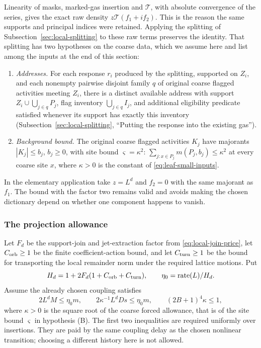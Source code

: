 Linearity of masks, marked-gas insertion and $\mathcal T$, with
absolute convergence of the series, gives the exact raw density
$z\mathcal T(f_1+if_2)$. This is the reason the same supports and
principal indices were retained. Applying the splitting of
Subsection~\ref{sec:local-splitting} to these raw terms preserves the
identity. That splitting has two hypotheses on the coarse data, which
we assume here and list among the inputs at the end of this section:
\begin{enumerate}
\item[(A)] \emph{Addresses.} For each response $r_i$ produced by the
  splitting, supported on $Z_i$, and each nonempty pairwise disjoint
  family $q$ of original coarse flagged activities meeting $Z_i$, there
  is a distinct available address with support
  $Z_i\cup\bigcup_{j\in q}P_j$, flag inventory $\bigcup_{j\in q}I_j$, and
  additional eligibility predicate satisfied whenever its support has
  exactly this inventory (Subsection~\ref{sec:local-splitting},
  ``Putting the response into the existing gas'').
\item[(B)] \emph{Background bound.} The original coarse flagged
  activities $K_j$ have majorants $|K_j|\le b_j$, $b_j\ge0$, with site
  bound $\varsigma=\kappa^2$:
  $\sum_{j:x\in P_j}m(P_j,b_j)\le\kappa^2$ at every coarse site $x$,
  where $\kappa>0$ is the constant of \eqref{eq:leaf-small-inputs}.
\end{enumerate} In the elementary application take $z=L^d$ and
$f_2=0$ with the same majorant as $f_1$. The bound with the factor
two remains valid and avoids making the chosen dictionary depend
on whether one component happens to vanish.

\subsubsection{The projection allowance}
Let $F_d$ be the support-join and jet-extraction factor from
\eqref{eq:local-join-price}, let $C_{\rm orb}\ge1$ be the finite
coefficient-action bound, and let $C_{\rm turn}\ge1$ be the bound
for transporting the local remainder norm under the required
lattice motions. Put
\[
 H_d=1+2F_d(1+C_{\rm orb}+C_{\rm turn}),\qquad
                     \eta_0=\operatorname{rate}(L)/H_d.
\]
Assume the already chosen coupling satisfies
\begin{equation}\label{eq:leaf-small-inputs}
 2L^d M\le\eta_0m,\qquad
 2\kappa^{-1}L^dDs\le\eta_0m,\qquad
                      (2B+1)^4\kappa\le1,
\end{equation}
where $\kappa>0$ is the square root of the coarse forced allowance,
that is of the site bound $\varsigma$ in hypothesis (B).
The first two inequalities are required uniformly over insertions.
They are paid by the same coupling delay as the chosen nonlinear
transition; choosing a different history here is not allowed.

